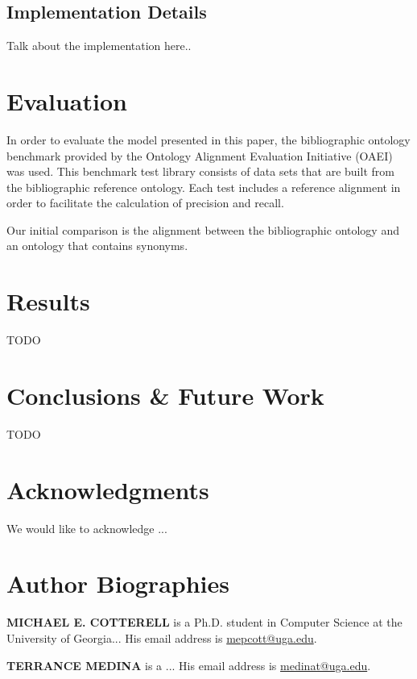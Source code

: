 \documentclass[letterpaper,twocolumn,12pt]{article}
\begin{document}
\subsection{Implementation Details}

Talk about the implementation here..

\section{Evaluation}

In order to evaluate the model presented in this paper, the bibliographic ontology benchmark provided by the Ontology Alignment Evaluation Initiative (OAEI) was used.
This benchmark test library consists of data sets that are built from the bibliographic reference ontology.
Each test includes a reference alignment in order to facilitate the calculation of precision and recall.

Our initial comparison is the alignment between the bibliographic ontology and an ontology that contains synonyms.

\section{Results}
TODO

\section{Conclusions \& Future Work}
TODO

\section*{Acknowledgments}
We would like to acknowledge ...

%

 

\section*{Author Biographies} 
\vspace{8 pt}
\noindent \textbf{MICHAEL E. COTTERELL} is a Ph.D. student in Computer Science at the University of Georgia... His email address is \href{mailto:mepcott@uga.edu}{mepcott@uga.edu}.

\vspace{8 pt}
\noindent \textbf{TERRANCE MEDINA} is a ... His email address is \href{mailto:medinat@uga.edu}{medinat@uga.edu}.
\end{document}
